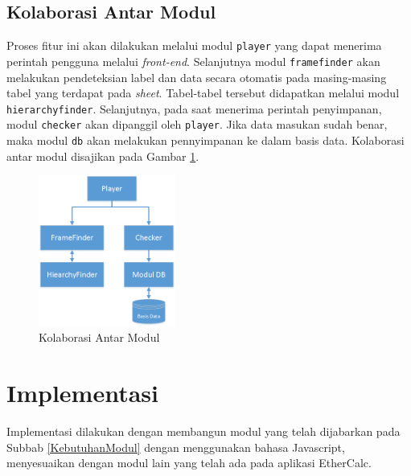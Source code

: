 	\subsection{Kolaborasi Antar Modul}
	Proses fitur ini akan dilakukan melalui modul \texttt{player} yang dapat menerima perintah pengguna melalui \textit{front-end}. Selanjutnya modul \texttt{framefinder} akan melakukan pendeteksian label dan data secara otomatis pada masing-masing tabel yang terdapat pada \textit{sheet}. Tabel-tabel tersebut didapatkan melalui modul \texttt{hierarchyfinder}. Selanjutnya, pada saat menerima perintah penyimpanan, modul \texttt{checker} akan dipanggil oleh \texttt{player}. Jika data masukan sudah benar, maka modul \texttt{db} akan melakukan pennyimpanan ke dalam basis data. Kolaborasi antar modul disajikan pada Gambar \ref{ModuleFlow}.

	\begin{figure}[htb]
	    \centering
	    \includegraphics[width=0.4\textwidth]{resources/chapter-4-module-flow.png}
	    \caption{Kolaborasi Antar Modul}
		\label{ModuleFlow}
	\end{figure}


\section{Implementasi}
Implementasi dilakukan dengan membangun modul yang telah dijabarkan pada Subbab \ref{KebutuhanModul} dengan menggunakan bahasa Javascript, menyesuaikan dengan modul lain yang telah ada pada aplikasi EtherCalc.
